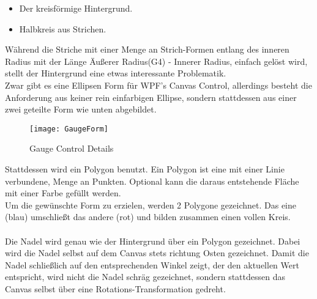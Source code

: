 \begin{itemize}
	\item Der kreisförmige Hintergrund.
	\item Halbkreis aus Strichen.
\end{itemize}
Während die Striche mit einer Menge an Strich-Formen entlang des inneren Radius mit der Länge Äußerer Radius(G4) - Innerer Radius, einfach gelöst wird, stellt der Hintergrund eine etwas interessante Problematik.\\
Zwar gibt es eine Ellipsen Form für WPF's Canvas Control, allerdings besteht die Anforderung aus keiner rein einfarbigen Ellipse, sondern stattdessen aus einer zwei geteilte Form wie unten abgebildet.
\begin{figure}[ht]
	\centering
	\texttt{[image: GaugeForm]}
	\caption{Gauge Control Details}
	\label{fig:gauge2}
\end{figure}
Stattdessen wird ein Polygon benutzt. Ein Polygon ist eine mit einer Linie verbundene, Menge an Punkten. Optional kann die daraus entstehende Fläche mit einer Farbe gefüllt werden.\\
Um die gewünschte Form zu erzielen, werden 2 Polygone gezeichnet. Das eine (blau) umschließt das andere (rot) und bilden zusammen einen vollen Kreis.\\
\\
Die Nadel wird genau wie der Hintergrund über ein Polygon gezeichnet. Dabei wird die Nadel selbst auf dem Canvas stets richtung Osten gezeichnet. Damit die Nadel schließlich auf den entsprechenden Winkel zeigt, der den aktuellen Wert entspricht, wird nicht die Nadel schräg gezeichnet, sondern stattdessen das Canvas selbst über eine Rotations-Transformation gedreht.
